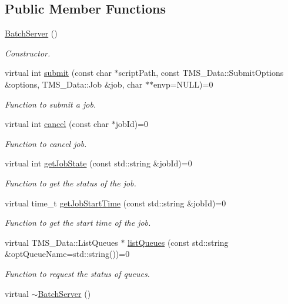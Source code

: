 \subsection*{Public Member Functions}
\begin{DoxyCompactItemize}
\item 
\hypertarget{classBatchServer_a7bacd852b35c5376a3d23a5744f7cf3f}{
\hyperlink{classBatchServer_a7bacd852b35c5376a3d23a5744f7cf3f}{BatchServer} ()}
\label{classBatchServer_a7bacd852b35c5376a3d23a5744f7cf3f}

\begin{DoxyCompactList}\small\item\em Constructor. \item\end{DoxyCompactList}\item 
virtual int \hyperlink{classBatchServer_a078c0f8605e770c02b8eca0351526f59}{submit} (const char $\ast$scriptPath, const TMS\_\-Data::SubmitOptions \&options, TMS\_\-Data::Job \&job, char $\ast$$\ast$envp=NULL)=0
\begin{DoxyCompactList}\small\item\em Function to submit a job. \item\end{DoxyCompactList}\item 
virtual int \hyperlink{classBatchServer_af40bbd83fa2bd1f1720e29800227cdb0}{cancel} (const char $\ast$jobId)=0
\begin{DoxyCompactList}\small\item\em Function to cancel job. \item\end{DoxyCompactList}\item 
virtual int \hyperlink{classBatchServer_ac82e407645e4ad185cf59edcee832d58}{getJobState} (const std::string \&jobId)=0
\begin{DoxyCompactList}\small\item\em Function to get the status of the job. \item\end{DoxyCompactList}\item 
virtual time\_\-t \hyperlink{classBatchServer_aa43eebf4a61d0d61646b7595630d2ef1}{getJobStartTime} (const std::string \&jobId)=0
\begin{DoxyCompactList}\small\item\em Function to get the start time of the job. \item\end{DoxyCompactList}\item 
virtual TMS\_\-Data::ListQueues $\ast$ \hyperlink{classBatchServer_ab5cb2d2073b50e7c1f81693baed942ea}{listQueues} (const std::string \&optQueueName=std::string())=0
\begin{DoxyCompactList}\small\item\em Function to request the status of queues. \item\end{DoxyCompactList}\item 
\hypertarget{classBatchServer_a790c2e3c638edda49b68ab77d45e6e08}{
virtual \hyperlink{classBatchServer_a790c2e3c638edda49b68ab77d45e6e08}{$\sim$BatchServer} ()}
\label{classBatchServer_a790c2e3c638edda49b68ab77d45e6e08}


\end{DoxyCompactItemize}
